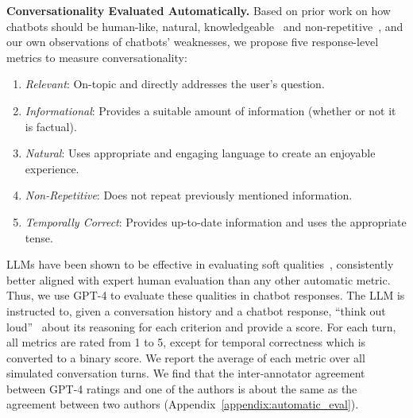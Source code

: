 {\bf Conversationality Evaluated Automatically.}
\label{sec:auto_eval}
Based on prior work on how chatbots should be human-like, natural, knowledgeable~\cite{li2019acuteeval} and non-repetitive~\cite{roller-etal-2021-recipes}, and our own observations of chatbots' weaknesses,
we propose five response-level metrics to measure conversationality:
\begin{enumerate}[topsep=0pt,noitemsep]
    \item 
{\em Relevant}: On-topic and directly addresses the user’s question.
    \item 
{\em Informational}: Provides a suitable amount of information (whether or not it is factual).
   \item 
{\em Natural}: Uses appropriate and engaging language to create an enjoyable experience.
    \item 
{\em Non-Repetitive}: Does not repeat previously mentioned information.
    \item
{\em Temporally Correct}: Provides up-to-date information and uses the appropriate tense.
\end{enumerate}

LLMs have been shown to be effective in evaluating soft qualities~\cite{chiang2023large, he2023annollm, kocmi2023large, liu2023geval, finch-etal-2023-leveraging}, consistently better aligned with expert human evaluation than any other automatic metric.
Thus, we use GPT-4 to evaluate these qualities in chatbot responses.
The LLM is instructed to, given a conversation history and a chatbot response, ``think out loud''~\cite{chain-of-thought} about its reasoning for each criterion and provide a score. For each turn, all metrics are rated from 1 to 5, except for temporal correctness which is converted to a binary score. We report the average of each metric over all simulated conversation turns. 
We find that the inter-annotator agreement between GPT-4 ratings and one of the authors is about the same as the agreement between two authors (Appendix~\ref{appendix:automatic_eval}).